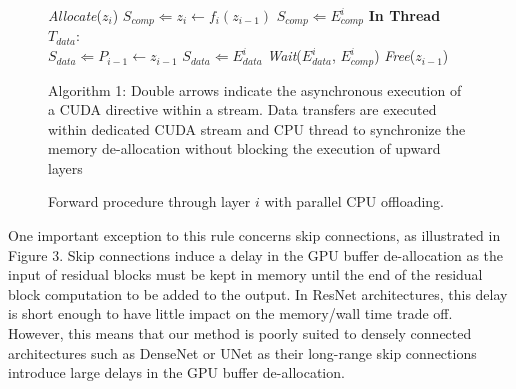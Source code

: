 \documentclass[11pt,onecolumn]{article}
\begin{document}
\begin{figure}[h]
\begin{algorithm}[H]
\vspace{1mm}
\vspace{1mm}
    \textit{Allocate}($z_i$)\;
	$S_{comp} \Leftarrow z_i \leftarrow f_i(z_{i-1})$\;
	$S_{comp} \Leftarrow E_{comp}^i$\;
\vspace{1mm}
	\textbf{In Thread}  $T_{data}$:\\
		\hspace{1.1cm} 	$S_{data} \Leftarrow P_{i-1} \leftarrow z_{i-1}$\;
		\hspace{1.1cm}  $S_{data} \Leftarrow E_{data}^i$\;
		\hspace{1.1cm}  \textit{Wait}($E_{data}^i$, $E_{comp}^i$)\;
		\hspace{1.1cm}  \textit{Free}($z_{i-1}$)\;
	\caption{Forward procedure through layer $i$ with parallel CPU offloading. }
\end{algorithm}
\small{Algorithm 1: Double arrows indicate the asynchronous execution of a CUDA directive within a stream.
Data transfers are executed within dedicated CUDA stream and CPU thread to
synchronize the memory de-allocation without blocking the execution of upward layers}
\end{figure}


One important exception to this rule concerns skip connections, as illustrated in Figure 3.
Skip connections induce a delay in the GPU buffer de-allocation as the input of residual blocks must
be kept in memory until the end of the residual block computation to be added to the output.
In ResNet architectures, this delay is short enough to have little impact on the memory/wall time trade off.
However, this means that our method is poorly suited to densely connected 
architectures such as DenseNet \cite{huang2017densely} or UNet \cite{ronneberger2015u} 
as their long-range skip connections introduce large delays in the GPU buffer de-allocation.
\end{document}
